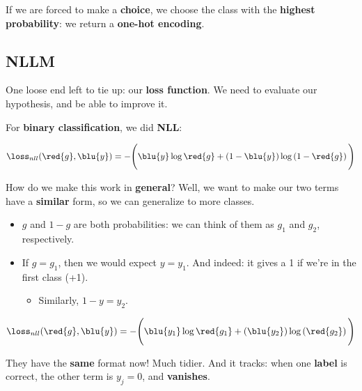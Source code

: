         
        If we are forced to make a \textbf{choice}, we choose the class with the \textbf{highest probability}: we return a \textbf{one-hot encoding}.
    
    \subsection{NLLM}
    
        One loose end left to tie up: our \textbf{loss function}. We need to evaluate our hypothesis, and be able to improve it.
        
        For \textbf{binary classification}, we did \textbf{NLL}:
    
        \begin{equation*}
            \loss_{nll}
            (\red{g} , \blu{y})
            =
            -
            \Bigg(
                \blu{y} \log{\red{g}}
                +
                \left( 1 - \blu{y} \right)
                \log
                \left( 1-\red{g} \right) 
            \Bigg)
        \end{equation*}
        
        How do we make this work in \textbf{general}? Well, we want to make our two terms have a \textbf{similar} form, so we can generalize to more classes.
        
        \begin{itemize}
            \item $g$ and $1-g$ are both probabilities: we can think of them as $g_1$ and $g_2$, respectively.
            \item If $g=g_1$, then we would expect $y=y_1$. And indeed: it gives a 1 if we're in the first class (+1).
                \begin{itemize}
                    \item Similarly, $1-y=y_2$.
                \end{itemize}
        \end{itemize}
        
        \begin{equation*}
            \loss_{nll}
            (\red{g} , \blu{y})
            =
            -
            \Bigg(
                \blu{y_1} \log{\red{g_1}}
                +
                \left( \blu{y_2} \right)
                \log
                \left( \red{g_2} \right) 
            \Bigg)
        \end{equation*}
        
        They have the \textbf{same} format now! Much tidier. And it tracks: when one \textbf{label} is correct, the other term is $y_j=0$, and \textbf{vanishes}.
        
